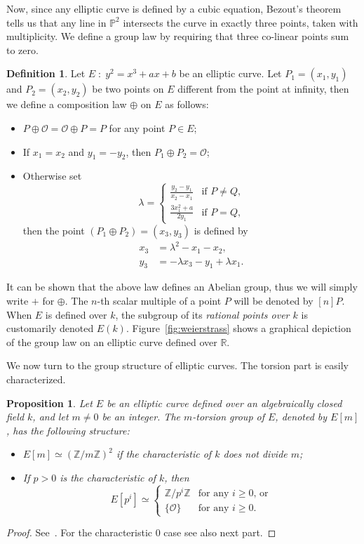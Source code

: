 \documentclass[10pt]{article}
\theoremstyle{plain}
\newtheorem{proposition}[theorem]{Proposition}
\theoremstyle{definition}
\newtheorem{definition}[theorem]{Definition}
\def\P{\ensuremath{\mathbb{P}}}
\def\O{\ensuremath{\mathcal{O}}}
\begin{document}
Now, since any elliptic curve is defined by a cubic equation, Bezout's
theorem tells us that any line in $\P^2$ intersects the curve in
exactly three points, taken with multiplicity. %
We define a group law by requiring that three co-linear points sum to
zero. %

\begin{definition}
  Let $E\;:\;y^2=x^3+ax+b$ be an elliptic curve. Let $P_1=(x_1,y_1)$
  and $P_2=(x_2,y_2)$ be two points on $E$ different from the point at
  infinity, then we define a composition law $⊕$ on $E$ as
  follows:
  \begin{itemize}
  \item $P ⊕ \O = \O ⊕ P = P$ for any point $P∈E$;
  \item If $x_1=x_2$ and $y_1=-y_2$, then $P_1⊕P_2 = \O$;
  \item Otherwise set
    \[λ =
      \begin{cases}
        \frac{y_2-y_1}{x_2-x_1} &\text{if $P≠Q$,}\\
        \frac{3x_1^2+a}{2y_1} &\text{if $P=Q$,}
      \end{cases}
    \]
    then the point $(P_1⊕P_2)=(x_3,y_3)$ is defined by
    \begin{align*}
      x_3 &= λ^2 - x_1 - x_2,\\
      y_3 &= -λx_3 - y_1 + λx_1.
    \end{align*}
  \end{itemize}
\end{definition}

It can be shown that the above law defines an Abelian group, thus we
will simply write $+$ for $⊕$. %
The $n$-th scalar multiple of a point $P$ will be denoted by $[n]P$. %
When $E$ is defined over $k$, the subgroup of its \emph{rational
  points over $k$} is customarily denoted $E(k)$. %
Figure~\ref{fig:weierstrass} shows a graphical depiction of the group
law on an elliptic curve defined over $ℝ$.

We now turn to the group structure of elliptic curves. %
The torsion part is easily characterized.

\begin{proposition}
  Let $E$ be an elliptic curve defined over an algebraically closed
  field $k$, and let $m≠0$ be an integer. %
  The $m$-torsion group of $E$, denoted by $E[m]$, has the following
  structure:
  \begin{itemize}
  \item $E[m] ≃ (ℤ/mℤ)^2$ if the characteristic of $k$ does not divide
    $m$;
  \item If $p>0$ is the characteristic of $k$, then 
    \[E[p^i] ≃
      \begin{cases}
        ℤ/p^iℤ & \text{for any $i≥0$, or}\\
        \{\O\} & \text{for any $i≥0$.}
      \end{cases}
    \]
  \end{itemize}
\end{proposition}
\begin{proof}
  See~\cite[Coro.~6.4]{silverman:elliptic}. For the characteristic $0$
  case see also next part.
\end{proof}
\end{document}

